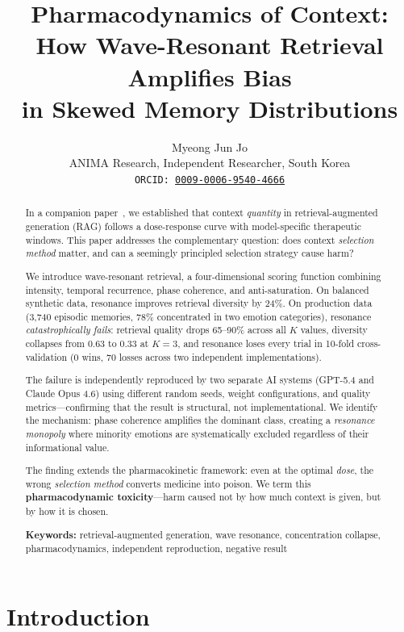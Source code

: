 \documentclass[11pt,a4paper]{article}
\title{%
  \textbf{Pharmacodynamics of Context:\\
  How Wave-Resonant Retrieval Amplifies Bias\\
  in Skewed Memory Distributions}
}
\author{%
  Myeong Jun Jo \\
  ANIMA Research, Independent Researcher, South Korea \\
  \texttt{ORCID: \href{https://orcid.org/0009-0006-9540-4666}{0009-0006-9540-4666}}
}
\date{}
\begin{document}
\maketitle

\begin{abstract}
In a companion paper~\citep{jo2026pharmacokinetics}, we established that context \emph{quantity} in retrieval-augmented generation (RAG) follows a dose-response curve with model-specific therapeutic windows. This paper addresses the complementary question: does context \emph{selection method} matter, and can a seemingly principled selection strategy cause harm?

We introduce wave-resonant retrieval, a four-dimensional scoring function combining intensity, temporal recurrence, phase coherence, and anti-saturation. On balanced synthetic data, resonance improves retrieval diversity by 24\%. On production data (3,740 episodic memories, 78\% concentrated in two emotion categories), resonance \emph{catastrophically fails}: retrieval quality drops 65--90\% across all $K$ values, diversity collapses from 0.63 to 0.33 at $K{=}3$, and resonance loses every trial in 10-fold cross-validation (0 wins, 70 losses across two independent implementations).

The failure is independently reproduced by two separate AI systems (GPT-5.4 and Claude Opus 4.6) using different random seeds, weight configurations, and quality metrics---confirming that the result is structural, not implementational. We identify the mechanism: phase coherence amplifies the dominant class, creating a \emph{resonance monopoly} where minority emotions are systematically excluded regardless of their informational value.

The finding extends the pharmacokinetic framework: even at the optimal \emph{dose}, the wrong \emph{selection method} converts medicine into poison. We term this \textbf{pharmacodynamic toxicity}---harm caused not by how much context is given, but by how it is chosen.

\vspace{6pt}
\noindent\textbf{Keywords:} retrieval-augmented generation, wave resonance, concentration collapse, pharmacodynamics, independent reproduction, negative result
\end{abstract}

\section{Introduction}
\end{document}
